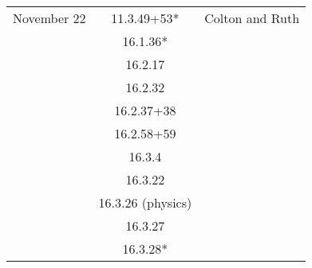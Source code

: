 \documentclass[12pt]{amsart}
\begin{document}
\begin{longtable}{c|c|l}
        November 22     & 11.3.49+53*                          & Colton and Ruth                          \\
                        & 16.1.36*                             &                                          \\
                        & 16.2.17                              &                                          \\
                        & 16.2.32                              &                                          \\
                        & 16.2.37+38                           &                                          \\
                        & 16.2.58+59                           &                                          \\
                        & 16.3.4                               &                                          \\
                        & 16.3.22                              &                                          \\
                        & 16.3.26 (physics)                    &                                          \\
                        & 16.3.27                              &                                          \\
                        & 16.3.28*                             &                                          
    \end{longtable}
\end{document}
